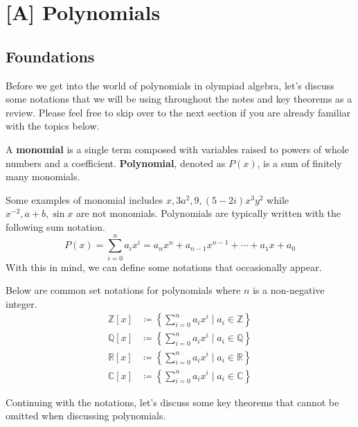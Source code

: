 \documentclass[../../../main.tex]{subfiles}
\begin{document}
\chapter{[A] Polynomials}


\section{Foundations}

Before we get into the world of polynomials in olympiad algebra,
let's discuss some notations that we will be using throughout the
notes and key theorems as a review. Please feel free to skip over
to the next section if you are already familiar with the topics
below.

\begin{definition}{}{}
A \textbf{monomial} is a single term composed with variables raised
to powers of whole numbers and a coefficient. \textbf{Polynomial},
denoted as $P(x)$, is a sum of finitely many monomials.
\end{definition}

Some examples of monomial includes $x, 3a^2, 9, (5-2i)x^3y^2$ while
$x^{-2}, a + b, \sin{x}$ are not monomials. Polynomials are
typically written with the following sum notation.
\[
P(x)
= \sum_{i=0}^n a_i x^i
= a_n x^n + a_{n-1} x^{n-1} + \cdots + a_1 x + a_0
\]
With this in mind, we can define some notations that occasionally
appear.

\begin{definition}{}{}
Below are common set notations for polynomials where $n$ is a
non-negative integer.
\vspace{-0.8\baselineskip}
\begin{align*}
    \mathbb{Z}[x]
    &\coloneqq \left\{
        \sum_{i=0}^n a_i x^i \mid a_i \in \mathbb{Z}
    \right\} \\
    \mathbb{Q}[x]
    &\coloneqq \left\{
        \sum_{i=0}^n a_i x^i \mid a_i \in \mathbb{Q}
    \right\} \\
    \mathbb{R}[x]
    &\coloneqq \left\{
        \sum_{i=0}^n a_i x^i \mid a_i \in \mathbb{R}
    \right\} \\
    \mathbb{C}[x]
    &\coloneqq \left\{
        \sum_{i=0}^n a_i x^i \mid a_i \in \mathbb{C}
    \right\}
\end{align*}
\end{definition}

Continuing with the notations, let's discuss some key theorems
that cannot be omitted when discussing polynomials.
\end{document}
